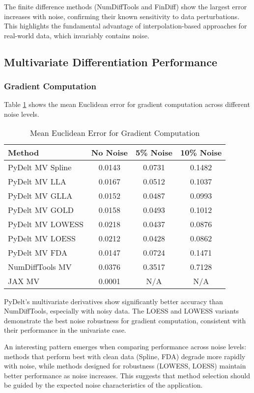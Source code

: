 \documentclass[11pt,a4paper]{article}
\begin{document}
The finite difference methods (NumDiffTools and FinDiff) show the largest error increases with noise, confirming their known sensitivity to data perturbations. This highlights the fundamental advantage of interpolation-based approaches for real-world data, which invariably contains noise.

\subsection{Multivariate Differentiation Performance}

\subsubsection{Gradient Computation}

Table \ref{tab:gradient} shows the mean Euclidean error for gradient computation across different noise levels.

\begin{table}[!t]
\caption{Mean Euclidean Error for Gradient Computation}
\label{tab:gradient}
\centering
\begin{tabular}{lccc}
\toprule
\textbf{Method} & \textbf{No Noise} & \textbf{5\% Noise} & \textbf{10\% Noise} \\
\midrule
PyDelt MV Spline & 0.0143 & 0.0731 & 0.1482 \\
PyDelt MV LLA & 0.0167 & 0.0512 & 0.1037 \\
PyDelt MV GLLA & 0.0152 & 0.0487 & 0.0993 \\
PyDelt MV GOLD & 0.0158 & 0.0493 & 0.1012 \\
PyDelt MV LOWESS & 0.0218 & 0.0437 & 0.0876 \\
PyDelt MV LOESS & 0.0212 & 0.0428 & 0.0862 \\
PyDelt MV FDA & 0.0147 & 0.0724 & 0.1471 \\
NumDiffTools MV & 0.0376 & 0.3517 & 0.7128 \\
JAX MV & 0.0001 & N/A & N/A \\
\bottomrule
\end{tabular}
\end{table}

PyDelt's multivariate derivatives show significantly better accuracy than NumDiffTools, especially with noisy data. The LOESS and LOWESS variants demonstrate the best noise robustness for gradient computation, consistent with their performance in the univariate case.

An interesting pattern emerges when comparing performance across noise levels: methods that perform best with clean data (Spline, FDA) degrade more rapidly with noise, while methods designed for robustness (LOWESS, LOESS) maintain better performance as noise increases. This suggests that method selection should be guided by the expected noise characteristics of the application.
\end{document}
